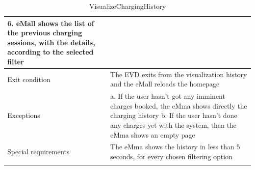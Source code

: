 \begin{center}
\begin{longtable}{p{4cm} p{11cm}}
        6. eMall shows the list of the previous charging sessions, with the details, according to the selected filter\\
     \hline
     Exit condition & The EVD exits from the visualization history and the eMall reloads the homepage \\
     \hline
     Exceptions & 
        a. If the user hasn't got any imminent charges booked, the eMma shows directly the charging history \newline
        b. If the user hasn't done any charges yet with the system, then the eMma shows an empty page \\
     \hline
     Special requirements &  The eMma shows the history in less than 5 seconds, for every chosen filtering option\\
     \hline
    \caption{VisualizeChargingHistory}
    \label{tab:VisualizeChargingHistory}
    \end{longtable}
\end{center}

